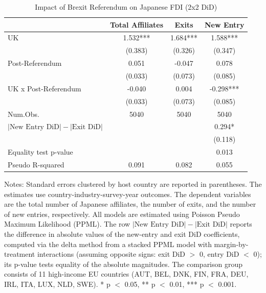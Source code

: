 \begin{table}[!ht]
\centering
\caption{\label{tab:export-latex}Impact of Brexit Referendum on Japanese FDI (2x2 DiD)\label{tab:2x2did_aggregate}}
\centering
\begin{threeparttable}
\begin{tabular}[t]{lccc}
\toprule
  & Total Affiliates & Exits & New Entry\\
\midrule
UK & 1.532*** & 1.684*** & 1.588***\\
 & (0.383) & (0.326) & (0.347)\\
Post-Referendum & 0.051 & -0.047 & 0.078\\
 & (0.033) & (0.073) & \vphantom{1} (0.085)\\
UK x Post-Referendum & -0.040 & 0.004 & -0.298***\\
 & (0.033) & (0.073) & (0.085)\\
\midrule
Num.Obs. & 5040 & 5040 & 5040\\
$\left|\textrm{New Entry DiD}\right| - \left|\textrm{Exit DiD}\right|$ &  &  & 0.294*\\
 &  &  & (0.118)\\
Equality test p-value &  &  & 0.013\\
Pseudo R-squared & 0.091 & 0.082 & 0.055\\
\bottomrule
\end{tabular}

\end{threeparttable}\par\medskip
\parbox{\linewidth}{\footnotesize Notes: Standard errors clustered by host country are reported in parentheses. The estimates use country-industry-survey-year outcomes. The dependent variables are the total number of Japanese affiliates, the number of exits, and the number of new entries, respectively. All models are estimated using Poisson Pseudo Maximum Likelihood (PPML). The row $\left|\textrm{New Entry DiD}\right| - \left|\textrm{Exit DiD}\right|$ reports the difference in absolute values of the new-entry and exit DiD coefficients, computed via the delta method from a stacked PPML model with margin-by-treatment interactions (assuming opposite signs: exit DiD $>$ 0, entry DiD $<$ 0); its p-value tests equality of the absolute magnitudes. The comparison group consists of 11 high-income EU countries (AUT, BEL, DNK, FIN, FRA, DEU, IRL, ITA, LUX, NLD, SWE). * p $<$ 0.05, ** p $<$ 0.01, *** p $<$ 0.001.
}

\end{table}
